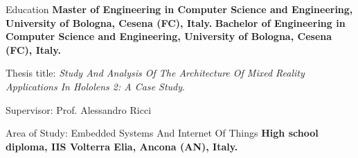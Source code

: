 \begin{rubric}{Education}
%
	\textbf{Master of Engineering in Computer Science and Engineering, University of Bologna, Cesena (FC), Italy.}
%
\entry*[2018 -- 2021]%
	\textbf{Bachelor of Engineering in Computer Science and Engineering, University of Bologna, Cesena (FC), Italy.}
	\par Thesis title: \emph{Study And Analysis Of The Architecture Of Mixed Reality Applications In Hololens 2: A Case Study}.
	\par Supervisor: Prof. Alessandro Ricci
	\par Area of Study: Embedded Systems And Internet Of Things
% 
\entry*[2013 -- 2018]%
	\textbf{High school diploma, IIS Volterra Elia, Ancona (AN), Italy.}
\end{rubric}
